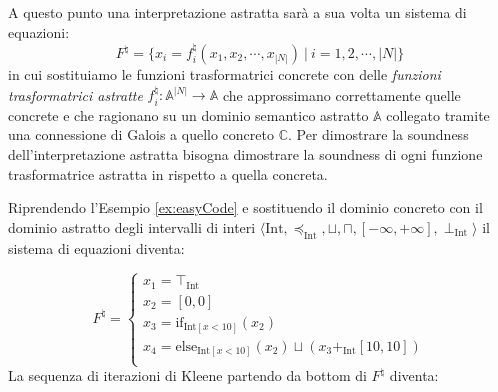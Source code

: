 A questo punto una interpretazione astratta sarà a sua volta un sistema di equazioni:
\[F^{\natural} = \{x_i = f_i^{\natural}(x_1, x_2, \cdots, x_{|N|})\ |\ i=1, 2,\cdots, |N|\}\]
in cui sostituiamo le funzioni trasformatrici concrete con delle \textit{funzioni trasformatrici astratte} \(f_i^{\natural}:\mathbb{A}^{|N|}\rightarrow\mathbb{A}\) che approssimano correttamente quelle concrete e che ragionano su un dominio semantico astratto \(\mathbb{A}\) collegato tramite una connessione di Galois a quello concreto \(\mathbb{C}\). Per dimostrare la soundness dell'interpretazione astratta bisogna dimostrare la soundness di ogni funzione trasformatrice astratta in rispetto a quella concreta. 

Riprendendo l'Esempio \ref{ex:easyCode} e sostituendo il dominio concreto con il dominio astratto degli intervalli di interi \(\langle\textrm{Int}, \preceq_{\textrm{Int}}, \sqcup, \sqcap, [-\infty, +\infty], \perp_{\textrm{Int}} \rangle\) il sistema di equazioni diventa: 

\[
F^{\natural} = 
\begin{cases}
   x_1 = \top_{\textrm{Int}} \\ 
   x_2 = [0, 0] \\
   x_3 = \textrm{if}_{\textrm{Int}[x < 10]}(x_2) \\
   x_4 = \textrm{else}_{\textrm{Int}[x < 10]}(x_2) \sqcup (x_3 +_{\textrm{Int}} [10, 10]) \\
\end{cases}
\]
La sequenza di iterazioni di Kleene partendo da bottom di \(F^{\natural}\) diventa:

